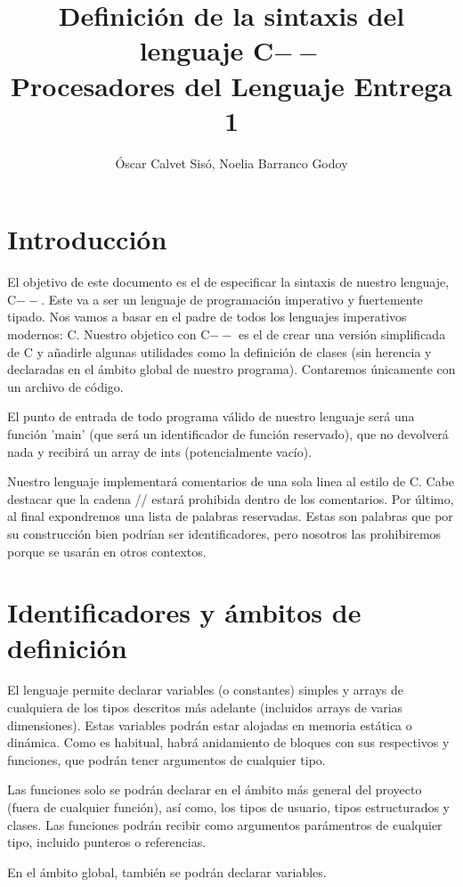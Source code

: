 \documentclass{article}
\title{%
  Definición de la sintaxis del lenguaje C$--$ \\
  \large Procesadores del Lenguaje Entrega 1}
\author{Óscar Calvet Sisó, Noelia Barranco Godoy}
\date{}
\begin{document}
\maketitle

\section{Introducción}
El objetivo de este documento es el de especificar la sintaxis de nuestro lenguaje, C$--$. Este va a ser un lenguaje de programación imperativo y fuertemente tipado. Nos vamos a basar en el padre de todos los lenguajes imperativos modernos: C. Nuestro objetico con C$--$ es el de crear una versión simplificada de C y añadirle algunas utilidades como la definición de clases (sin herencia y declaradas en el ámbito global de nuestro programa). Contaremos únicamente con un archivo de código.

\noindent El punto de entrada de todo programa válido de nuestro lenguaje será una función 'main' (que será un identificador de función reservado), que no devolverá nada y recibirá un array de ints (potencialmente vacío).

\noindent Nuestro lenguaje implementará comentarios de una sola linea al estilo de C. Cabe destacar que la cadena // estará prohibida dentro de los comentarios. Por último, al final expondremos una lista de palabras reservadas. Estas son palabras que por su construcción bien podrían ser identificadores, pero nosotros las prohibiremos porque se usarán en otros contextos.

\section{Identificadores y ámbitos de definición}
El lenguaje permite declarar variables (o constantes) simples y arrays de cualquiera de los tipos descritos más adelante (incluidos arrays de varias dimensiones). Estas variables podrán estar alojadas en memoria estática o dinámica. Como es habitual, habrá anidamiento de bloques con sus respectivos y funciones, que podrán tener argumentos de cualquier tipo.

\noindent Las funciones solo se podrán declarar en el ámbito más general del proyecto (fuera de cualquier función), así como, los tipos de usuario, tipos estructurados y clases. Las funciones podrán recibir como argumentos parámentros de cualquier tipo, incluido punteros o referencias.

\noindent En el ámbito global, también se podrán declarar variables.
\end{document}
